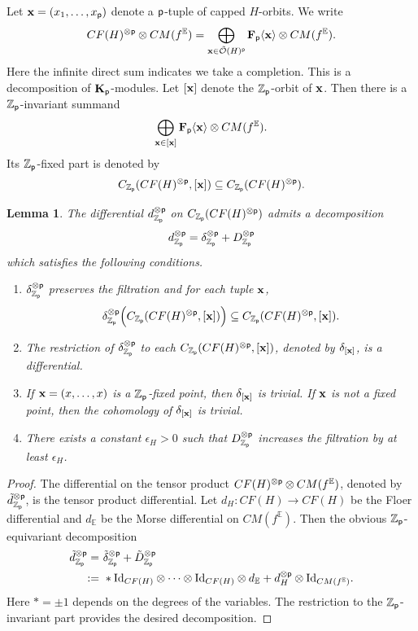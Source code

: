 \documentclass[reqno, 10pt]{amsart}
\numberwithin{equation}{section}
\numberwithin{equation}{section}
\renewcommand{\subset}{\subseteq}
\newtheorem{lemma}[thm]{Lemma}
\theoremstyle{definition}
\theoremstyle{remark}
\newcommand{\beqn}{\begin{equation*}}
\newcommand{\eeqn}{\end{equation*}}
\newcommand{\mb}{\mathbb}
\newcommand{\mc}{\mathcal}
\newcommand{\p}{{\sf p}}
\newcommand{\fp}{{\bf F}_{\sf p}}
\newcommand{\kp}{{\bf K}_{\sf p}}
\newcommand{\zp}{{{\mb Z}_{\sf p}}}
\newcommand{\ep}{{{\mathbb E}}}
\begin{document}
Let ${\bf x} = (x_1, \ldots, x_\p)$ denote a $\p$-tuple of capped $H$-orbits. We write 
\beqn
CF(H)^{\otimes \p} \otimes CM(f^\ep) = \bigoplus_{{\bf x} \in \tilde {\mc O}(H)^{\p}} \fp \langle {\bf x} \rangle \otimes CM(f^\ep).
\eeqn
Here the infinite direct sum indicates we take a completion. This is a decomposition of $\kp$-modules. Let $[{\bf x}]$ denote the $\zp$-orbit of ${\bf x}$. Then there is a $\zp$-invariant summand
\beqn
\bigoplus_{{\bf x} \in [{\bf x}]} \fp \langle {\bf x} \rangle \otimes CM(f^\ep).
\eeqn
Its $\zp$-fixed part is denoted by 
\beqn
C_{\zp}(CF(H)^{\otimes \p}, [{\bf x}]) \subset C_{\zp}(CF(H)^{\otimes \p}).
\eeqn





\begin{lemma}
The differential $d_{\zp}^{\otimes \p}$ on $C_{\zp}(CF(H)^{\otimes \p})$ admits a decomposition 
\beqn
d_{\zp}^{\otimes \p} = \delta_{\zp}^{\otimes \p} + D_{\zp}^{\otimes \p}
\eeqn
which satisfies the following conditions.
\begin{enumerate}

\item $\delta_{\zp}^{\otimes \p}$ preserves the filtration and for each tuple ${\bf x}$, 
\beqn
\delta_{\zp}^{\otimes \p} \Big( C_{\zp}(CF(H)^{\otimes \p}, [{\bf x}]) \Big) \subset C_{\zp} ( CF(H)^{\otimes \p}, [{\bf x}]).
\eeqn

\item The restriction of $\delta_{\zp}^{\otimes \p}$ to each $C_{\zp}(CF(H)^{\otimes \p}, [{\bf x}])$, denoted by $\delta_{[{\bf x}]}$, is a differential. 

\item If ${\bf x} = (x, \ldots, x)$ is a $\zp$-fixed point, then $\delta_{[{\bf x}]}$ is trivial. If ${\bf x}$ is not a fixed point, then the cohomology of $\delta_{[{\bf x}]}$ is trivial.

\item There exists a constant $\epsilon_H>0$ such that $D_{\zp}^{\otimes \p}$ increases the filtration by at least $\epsilon_H$.
\end{enumerate}
\end{lemma}

\begin{proof}
The differential on the tensor product $CF(H)^{\otimes \p} \otimes CM(f^\ep)$, denoted by $\tilde d_{\zp}^{\otimes\p}$,  is the tensor product differential. Let $d_H: CF(H) \to CF(H)$ be the Floer differential and $d_{\ep}$ be the Morse differential on $CM(f^\ep)$. Then the obvious $\zp$-equivariant decomposition
\beqn
\begin{split}
\tilde d_{\zp}^{\otimes \p} = &\ \tilde \delta_{\zp}^{\otimes \p}  + \tilde D_{\zp}^{\otimes \p} \\
 := &\ \ast {\rm Id}_{CF(H)} \otimes \cdots \otimes {\rm Id}_{CF(H)} \otimes d_{\ep}  + d_H^{\otimes \p} \otimes {\rm Id}_{CM(f^\ep)}.
\end{split}
\eeqn
Here $\ast = \pm 1$ depends on the degrees of the variables. The restriction to the $\zp$-invariant part provides the desired decomposition.
\end{proof}
\end{document}
